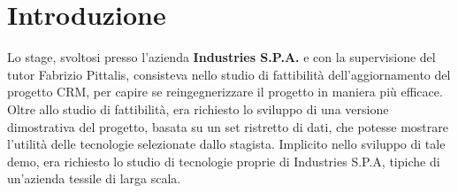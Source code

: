 \pagestyle{fancy}
\fancyhf{}
\fancyhead{}
\fancyhead[RO, LE] {\thepage}
\fancyfoot{}

\section{Introduzione}
Lo stage, svoltosi presso l'azienda \textbf{Industries S.P.A.} e con la supervisione del tutor Fabrizio Pittalis, consisteva nello studio di fattibilità dell'aggiornamento del progetto CRM, per capire se reingegnerizzare il progetto in maniera più efficace.
Oltre allo studio di fattibilità, era richiesto lo sviluppo di una versione dimostrativa del progetto, basata su un set ristretto di dati, che potesse mostrare l'utilità delle tecnologie selezionate dallo stagista.
Implicito nello sviluppo di tale demo, era richiesto lo studio di tecnologie proprie di Industries S.P.A, tipiche di un'azienda tessile di larga scala.